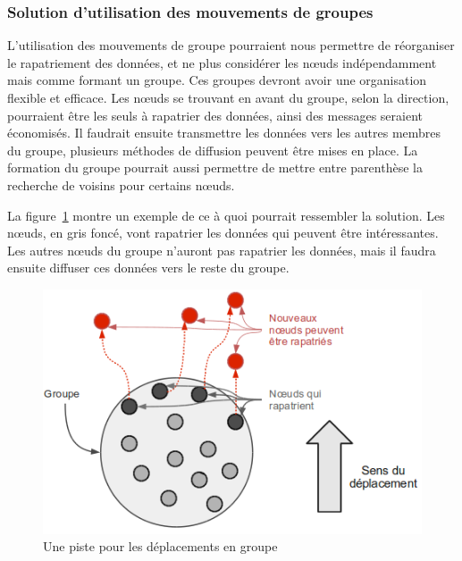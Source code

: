 \subsubsection{Solution d'utilisation des mouvements de groupes}
\par L'utilisation des mouvements de groupe pourraient nous permettre de réorganiser le rapatriement des données, et ne plus considérer les nœuds indépendamment mais comme formant un groupe. Ces groupes devront avoir une organisation flexible et efficace. Les nœuds se trouvant en avant du groupe, selon la direction, pourraient être les seuls à rapatrier des données, ainsi des messages seraient économisés. Il faudrait ensuite transmettre les données vers les autres membres du groupe, plusieurs méthodes de diffusion peuvent être mises en place. La formation du groupe pourrait aussi permettre de mettre entre parenthèse la recherche de voisins pour certains nœuds. 
\par La figure~\ref{mouvgroup} montre un exemple de ce à quoi pourrait ressembler la solution. Les nœuds, en gris foncé, vont rapatrier les données qui peuvent être intéressantes. Les autres nœuds du groupe n'auront pas rapatrier les données, mais il faudra ensuite diffuser ces données vers le reste du groupe.

        \begin{figure}[!h]
        \centering
        \includegraphics[scale=0.55]{./Ressources/Images/mouvgroup.png}
        \caption{Une piste pour les déplacements en groupe}
        \label{mouvgroup}
        \end{figure}

\newpage
 
